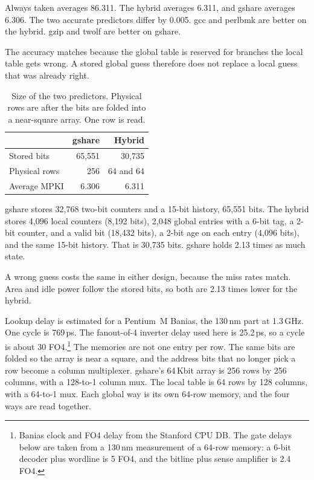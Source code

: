 \documentclass[11pt]{article}
\begin{document}
Always taken averages 86.311. The hybrid averages 6.311, and gshare averages
6.306. The two accurate predictors differ by 0.005. gcc and perlbmk are
better on the hybrid. gzip and twolf are better on gshare.

The accuracy matches because the global table is reserved for branches the
local table gets wrong. A stored global guess therefore does not replace a
local guess that was already right.

\begin{table}[ht]
\centering
\begin{tabular}{l r r}
\toprule
& gshare & Hybrid \\
\midrule
Stored bits  & 65,551 & 30,735 \\
Physical rows & 256 & 64 and 64 \\
Average MPKI & 6.306  & 6.311 \\
\bottomrule
\end{tabular}
\caption{Size of the two predictors. Physical rows are after the bits are folded into a near-square array. One row is read.}
\end{table}

gshare stores 32,768 two-bit counters and a 15-bit history, 65,551 bits.
The hybrid stores 4,096 local counters (8,192 bits), 2,048 global entries
with a 6-bit tag, a 2-bit counter, and a valid bit (18,432 bits), a 2-bit
age on each entry (4,096 bits), and the same 15-bit history. That is
30,735 bits. gshare holds 2.13 times as much state.

A wrong guess costs the same in either design, because the miss rates match.
Area and idle power follow the stored bits, so both are 2.13 times lower
for the hybrid.

Lookup delay is estimated for a Pentium~M Banias, the 130\,nm part at
1.3\,GHz. One cycle is 769\,ps. The fanout-of-4 inverter delay used here is
25.2\,ps, so a cycle is about 30 FO4.\footnote{Banias clock and FO4 delay
from the Stanford CPU DB. The gate delays below are taken from a 130\,nm
measurement of a 64-row memory: a 6-bit decoder plus wordline is 5 FO4, and
the bitline plus sense amplifier is 2.4 FO4.}
The memories are not one entry per row. The same bits are folded so the
array is near a square, and the address bits that no longer pick a row
become a column multiplexer. gshare's 64\,Kbit array is 256 rows by 256
columns, with a 128-to-1 column mux. The local table is 64 rows by 128
columns, with a 64-to-1 mux. Each global way is its own 64-row memory, and
the four ways are read together.
\end{document}
